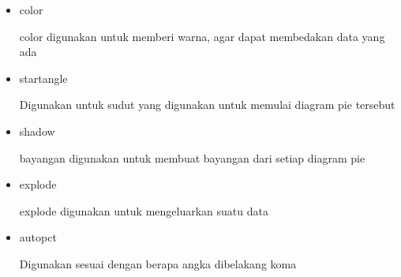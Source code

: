 \begin{enumerate}
\begin{itemize}
    \item color

    color digunakan untuk memberi warna, agar dapat membedakan data yang ada

    \item startangle

    Digunakan untuk sudut yang digunakan untuk memulai diagram pie tersebut

    \item shadow

    bayangan digunakan untuk membuat bayangan dari setiap diagram pie 

    \item explode

    explode digunakan untuk mengeluarkan suatu data 

    \item autopct

    Digunakan sesuai dengan berapa angka dibelakang koma 

\end{itemize} 
\end{enumerate}

